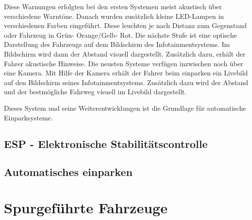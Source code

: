 Diese Warnungen erfolgten bei den ersten Systemen meist akustisch über verschiedene Warntöne. Danach wurden zusätzlich kleine LED-Lampen in verschiedenen Farben eingeführt. Diese leuchten je nach Distanz zum Gegenstand oder Fahrzeug in Grün- Orange/Gelb- Rot. Die nächste Stufe ist eine optische Darstellung des Fahrzeugs auf dem Bildschirm des Infotainmentsystems. Im Bildschirm wird dann der Abstand visuell dargestellt. Zusätzlich dazu, erhält der Fahrer akustische Hinweise. Die neusten Systeme verfügen inzwischen noch über eine Kamera. Mit Hilfe der Kamera erhält der Fahrer beim einparken ein Livebild auf den Bildschirm seines Infotainmentsystems. Zusätzlich dazu wird der Abstand und der bestmögliche Fahrweg visuell im Livebild dargestellt.

Dieses System und seine Weiterentwicklungen ist die Grundlage für automatische Einparksysteme. 
\subsection{ESP - Elektronische Stabilitätscontrolle}

\subsection{Automatisches einparken}

\section{Spurgeführte Fahrzeuge}